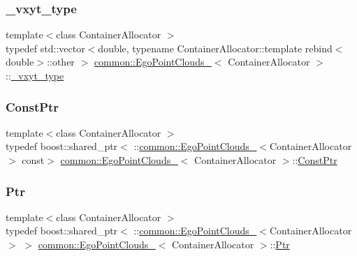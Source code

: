 \subsubsection{\texorpdfstring{\+\_\+vxyt\+\_\+type}{\_vxyt\_type}}
{\footnotesize\ttfamily template$<$class Container\+Allocator $>$ \\
typedef std\+::vector$<$double, typename Container\+Allocator\+::template rebind$<$double$>$\+::other $>$ \hyperlink{structcommon_1_1EgoPointClouds__}{common\+::\+Ego\+Point\+Clouds\+\_\+}$<$ Container\+Allocator $>$\+::\hyperlink{structcommon_1_1EgoPointClouds___a92f4c266292be35a268030b544d34d6d}{\+\_\+vxyt\+\_\+type}}

\mbox{\label{structcommon_1_1EgoPointClouds___af65d2da0bc1ac27030e411cd9c0f5db3}} 
\subsubsection{\texorpdfstring{Const\+Ptr}{ConstPtr}}
{\footnotesize\ttfamily template$<$class Container\+Allocator $>$ \\
typedef boost\+::shared\+\_\+ptr$<$ \+::\hyperlink{structcommon_1_1EgoPointClouds__}{common\+::\+Ego\+Point\+Clouds\+\_\+}$<$Container\+Allocator$>$ const$>$ \hyperlink{structcommon_1_1EgoPointClouds__}{common\+::\+Ego\+Point\+Clouds\+\_\+}$<$ Container\+Allocator $>$\+::\hyperlink{structcommon_1_1EgoPointClouds___af65d2da0bc1ac27030e411cd9c0f5db3}{Const\+Ptr}}

\mbox{\label{structcommon_1_1EgoPointClouds___a6e66bc07ffbc33db89dfb13c66a5a4cd}} 
\subsubsection{\texorpdfstring{Ptr}{Ptr}}
{\footnotesize\ttfamily template$<$class Container\+Allocator $>$ \\
typedef boost\+::shared\+\_\+ptr$<$ \+::\hyperlink{structcommon_1_1EgoPointClouds__}{common\+::\+Ego\+Point\+Clouds\+\_\+}$<$Container\+Allocator$>$ $>$ \hyperlink{structcommon_1_1EgoPointClouds__}{common\+::\+Ego\+Point\+Clouds\+\_\+}$<$ Container\+Allocator $>$\+::\hyperlink{structcommon_1_1EgoPointClouds___a6e66bc07ffbc33db89dfb13c66a5a4cd}{Ptr}}


